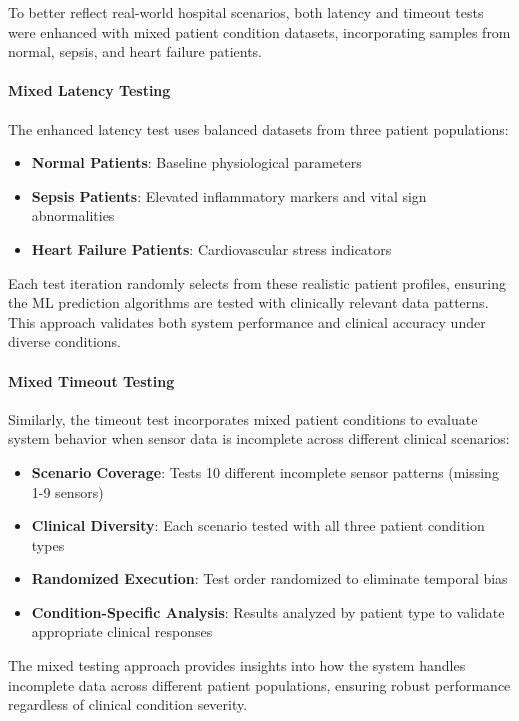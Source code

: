 To better reflect real-world hospital scenarios, both latency and timeout tests were enhanced with mixed patient condition datasets, incorporating samples from normal, sepsis, and heart failure patients.

\paragraph{Mixed Latency Testing}
The enhanced latency test uses balanced datasets from three patient populations:

\begin{itemize}
    \item \textbf{Normal Patients}: Baseline physiological parameters
    \item \textbf{Sepsis Patients}: Elevated inflammatory markers and vital sign abnormalities
    \item \textbf{Heart Failure Patients}: Cardiovascular stress indicators
\end{itemize}

Each test iteration randomly selects from these realistic patient profiles, ensuring the ML prediction algorithms are tested with clinically relevant data patterns. This approach validates both system performance and clinical accuracy under diverse conditions.

\paragraph{Mixed Timeout Testing}
Similarly, the timeout test incorporates mixed patient conditions to evaluate system behavior when sensor data is incomplete across different clinical scenarios:

\begin{itemize}
    \item \textbf{Scenario Coverage}: Tests 10 different incomplete sensor patterns (missing 1-9 sensors)
    \item \textbf{Clinical Diversity}: Each scenario tested with all three patient condition types
    \item \textbf{Randomized Execution}: Test order randomized to eliminate temporal bias
    \item \textbf{Condition-Specific Analysis}: Results analyzed by patient type to validate appropriate clinical responses
\end{itemize}

The mixed testing approach provides insights into how the system handles incomplete data across different patient populations, ensuring robust performance regardless of clinical condition severity.

